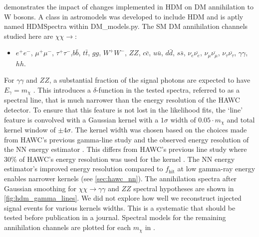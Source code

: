  demonstrates the impact of changes implemented in HDM on DM
annihilation to W bosons.
A class in astromodels was developed to include HDM and is aptly named HDMSpectra within DM\_models.py.
The SM DM annihilation channels studied here are $\chi\chi \rightarrow$:
\begin{itemize}
    \item[] $e^+e^-$, $\mu^+\mu^-$, $\tau^+\tau^-$,$b\bar{b}$, $t\bar{t}$, $gg$, $W^+W^-$, $ZZ$, $c\bar{c}$, $u\bar{u}$, $d\bar{d}$, $s\bar{s}$, $\nu_e \overline{\nu_e}$, $\nu_\mu \overline{\nu_\mu}$, $\nu_\tau \overline{\nu_\tau}$, $\gamma\gamma$, $hh$.
\end{itemize}
For $\gamma\gamma$ and $ZZ$, a substantial fraction of the signal photons are expected to have $E_\gamma = m_\chi$ \cite{Rodd:HDM_spec}.
This introduces a $\delta$-function in the tested spectra, referred to as a spectral line, that is much narrower than the energy resolution of the HAWC detector.
To ensure that this feature is not lost in the likelihood fits, the `line' feature is convolved with a Gaussian kernel with a $1\sigma$ width of $0.05 \cdot m_\chi$ and total kernel window of $\pm4\sigma$.
The kernel width was chosen based on the choices made from HAWC's previous gamma-line study \cite{HAWC_dm_gammalines} and the observed energy resolution of the NN energy estimator \cite{100TEV_Crab_HAWC}.
This differs from HAWC's previous line study where 30\% of HAWC's energy resolution was used for the kernel \cite{HAWC_dm_gammalines}.
The NN energy estimator's improved energy resolution compared to $f_\mathrm{hit}$ at low gamma-ray energy enables narrower kernels \cite{Rodd:HDM_spec} (see \cref{sec:hawc_nn}).
The annihilation spectra after Gaussian smoothing for $\chi\chi \rightarrow \gamma\gamma$ and $ZZ$ spectral hypotheses are shown in \cref{fig:hdm_gamma_lines}.
We did not explore how well we reconstruct injected signal events for various kernels widths.
This is a systematic that should be tested before publication in a journal.
Spectral models for the remaining annihilation channels are plotted for each $m_\chi$ in .

